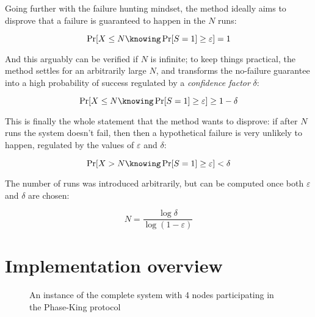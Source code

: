 \documentclass{article}
\begin{document}
    Going further with the failure hunting mindset, the method ideally aims to disprove that a failure is guaranteed to happen in the $N$ runs:
    
    \[
        \Pr[X \leq N \knowing \Pr[S = 1] \geq \varepsilon] = 1
    \]

    And this arguably can be verified if $N$ is infinite; to keep things practical, the method settles for an arbitrarily large $N$, and transforms the no-failure guarantee into a high probability of success regulated by a \emph{confidence factor} $\delta$:
    
    \[
        \Pr[X \leq N \knowing \Pr[S = 1] \geq \varepsilon] \geq 1 - \delta
    \]

    This is finally the whole statement that the method wants to disprove: if after $N$ runs the system doesn't fail, then then a hypothetical failure is very unlikely to happen, regulated by the values of $\varepsilon$ and $\delta$:

    \[
        \Pr[X > N \knowing \Pr[S = 1] \geq \varepsilon] < \delta
    \]
    
    The number of runs was introduced arbitrarily, but can be computed once both $\varepsilon$ and $\delta$ are chosen:

    \[
        N = \frac{\log \delta}{\log (1 - \varepsilon)}
    \]
    
    \section{Implementation overview}
    
    \begin{figure}[ht]
        \centering
        \caption{An instance of the complete system with 4 nodes participating in the Phase-King protocol}
        \label{fig:pk4ex}
    \end{figure}
    
\end{document}
